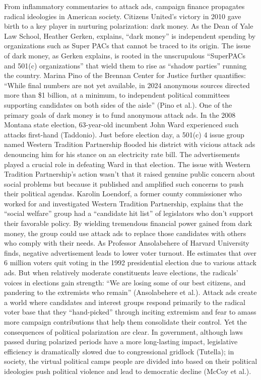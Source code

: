 \documentclass[12pt, a4paper, twoside]{article}
\begin{document}
From inflammatory commentaries to attack ads, campaign finance propagates radical ideologies in American society. Citizens United’s victory in 2010 gave birth to a key player in nurturing polarization: dark money. As the Dean of Yale Law School, Heather Gerken, explains, “dark money” is independent spending by organizations such as Super PACs that cannot be traced to its origin. The issue of dark money, as Gerken explains, is rooted in the unscrupulous “SuperPACs and 501(c) organizations” that wield them to rise as “shadow parties” running the country. Marina Pino of the Brennan Center for Justice further quantifies: “While final numbers are not yet available, in 2024 anonymous sources directed more than \$1 billion, at a minimum, to independent political committees supporting candidates on both sides of the aisle” (Pino et al.). One of the primary goals of dark money is to fund anonymous attack ads. In the 2008 Montana state election, 63-year-old incumbent John Ward experienced such attacks first-hand (Taddonio). Just before election day, a 501(c) 4 issue group named Western Tradition Partnership flooded his district with vicious attack ads denouncing him for his stance on an electricity rate bill. The advertisements played a crucial role in defeating Ward in that election. The issue with Western Tradition Partnership’s action wasn’t that it raised genuine public concern about social problems but because it published and amplified such concerns to push their political agendas. Karolin Loendorf, a former county commissioner who worked for and investigated Western Tradition Partnership, explains that the “social welfare” group had a “candidate hit list” of legislators who don't support their favorable policy. By wielding tremendous financial power gained from dark money, the group could use attack ads to replace those candidates with others who comply with their needs. As Professor Ansolabehere of Harvard University finds, negative advertisement leads to lower voter turnout. He estimates that over 6 million voters quit voting in the 1992 presidential election due to various attack ads. But when relatively moderate constituents leave elections, the radicals’ voices in elections gain strength: “We are losing some of our best citizens, and pandering to the extremists who remain” (Ansolabehere et al.). Attack ads create a world where candidates and interest groups respond primarily to the radical voter base that they “hand-picked” through inciting extremism and fear to amass more campaign contributions that help them consolidate their control. Yet the consequences of political polarization are clear. In government, although laws passed during polarized periods have a more long-lasting impact, legislative efficiency is dramatically slowed due to congressional gridlock (Tutella); in society, the virtual political camps people are divided into based on their political ideologies push political violence and lead to democratic decline (McCoy et al.). 
\end{document}
